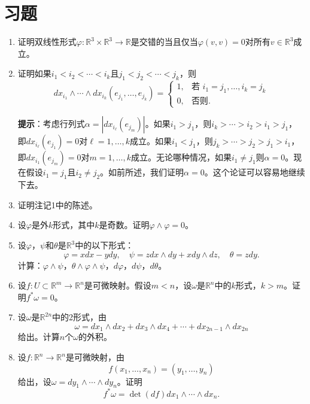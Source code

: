 \documentclass[12pt,a4paper]{ctexbook}
\begin{document}
\section*{习题}
\begin{enumerate}
    \item 证明双线性形式$\varphi:\mathbb{R}^3\times\mathbb{R}^3\to\mathbb{R}$是交错的当且仅当$\varphi(v,v)=0$对所有$v\in\mathbb{R}^3$成立。
    
    \item 证明如果$i_1<i_2<\cdots<i_k$且$j_1<j_2<\cdots<j_k$，则
    $$dx_{i_1}\wedge\cdots\wedge dx_{i_k}(e_{j_1},\ldots,e_{j_k}) = \begin{cases} 1, & \text{若 } i_1=j_1,\ldots,i_k=j_k \\ 0, & \text{否则}. \end{cases}$$
    
    \textbf{提示}：考虑行列式$\alpha = |dx_{i_\ell}(e_{j_m})|$。如果$i_1>j_1$，则$i_k>\cdots>i_2>i_1>j_1$，即$dx_{i_\ell}(e_{j_1})=0$对$\ell=1,\ldots,k$成立。如果$i_1<j_1$，则$j_k>\cdots>j_2>j_1>i_1$，即$dx_{i_1}(e_{j_m})=0$对$m=1,\ldots,k$成立。无论哪种情况，如果$i_1\neq j_1$则$\alpha=0$。现在假设$i_1=j_1$且$i_2\neq j_2$。如前所述，我们证明$\alpha=0$。这个论证可以容易地继续下去。
    
    \item 证明注记1中的陈述。
    
    \item 设$\varphi$是外$k$形式，其中$k$是奇数。证明$\varphi\wedge\varphi=0$。
    
    \item 设$\varphi$，$\psi$和$\theta$是$\mathbb{R}^3$中的以下形式：
    $$\varphi = xdx - ydy,\quad \psi = zdx\wedge dy + xdy\wedge dz,\quad \theta = zdy.$$
    计算：$\varphi\wedge\psi$，$\theta\wedge\varphi\wedge\psi$，$d\varphi$，$d\psi$，$d\theta$。
    
    \item 设$f:U\subset\mathbb{R}^m\to\mathbb{R}^n$是可微映射。假设$m<n$，设$\omega$是$\mathbb{R}^n$中的$k$形式，$k>m$。证明$f^*\omega=0$。
    
    \item 设$\omega$是$\mathbb{R}^{2n}$中的2形式，由
    $$\omega = dx_1\wedge dx_2 + dx_3\wedge dx_4 + \cdots + dx_{2n-1}\wedge dx_{2n}$$
    给出。计算$n$个$\omega$的外积。
    
    \item 设$f:\mathbb{R}^n\to\mathbb{R}^n$是可微映射，由
    $$f(x_1,\ldots,x_n) = (y_1,\ldots,y_n)$$
    给出，设$\omega = dy_1\wedge\cdots\wedge dy_n$。证明
    $$f^*\omega = \det(df)dx_1\wedge\cdots\wedge dx_n.$$
    

\end{enumerate}
\end{document}
